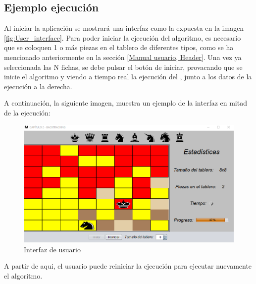 \subsection{Ejemplo ejecución}

Al iniciar la aplicación se mostrará una interfaz como la expuesta en la imagen \ref{fig:User_interface}. Para poder iniciar la ejecución del algoritmo, es necesario que se coloquen 1 o más piezas en el tablero de diferentes tipos, como se ha mencionado anteriormente en la sección \ref{Manual usuario, Header}. Una vez ya seleccionada las N fichas, se debe pulsar el botón de iniciar, provacando que se inicie el algoritmo y viendo a tiempo real la ejecución del , junto a los datos de la ejecución a la derecha.\bigskip

A continuación, la siguiente imagen, muestra un ejemplo de la interfaz en mitad de la ejecución:

\begin{figure}[!h]
    \centering
    \includegraphics[width=\linewidth]{Usage/img/ejecucion.png}
    \caption{Interfaz de usuario}
    \label{fig:Ejemplo ejecución}
\end{figure}

A partir de aqui, el usuario puede reiniciar la ejecución para ejecutar nuevamente el algoritmo.